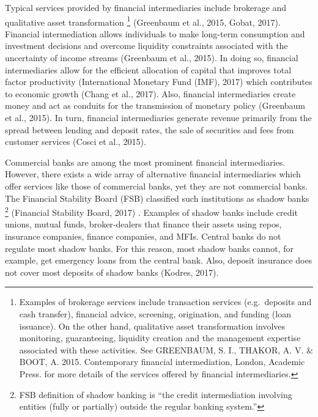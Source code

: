 \documentclass[a4paper, nobind]{templates/ociamthesis}
\begin{document}
Typical services provided by financial intermediaries include brokerage and qualitative asset transformation \footnote{Examples of brokerage services include transaction services (e.g.~deposits and cash transfer), financial advice, screening, origination, and funding (loan issuance). On the other hand, qualitative asset transformation involves monitoring, guaranteeing, liquidity creation and the management expertise associated with these activities. See GREENBAUM, S. I., THAKOR, A. V. \& BOOT, A. 2015. Contemporary financial intermediation, London, Academic Press. for more details of the services offered by financial intermediaries.} (Greenbaum et al., 2015, Gobat, 2017). Financial intermediation allows individuals to make long-term consumption and investment decisions and overcome liquidity constraints associated with the uncertainty of income streams (Greenbaum et al., 2015). In doing so, financial intermediaries allow for the efficient allocation of capital that improves total factor productivity (International Monetary Fund (IMF), 2017) which contributes to economic growth (Chang et al., 2017). Also, financial intermediaries create money and act as conduits for the transmission of monetary policy (Greenbaum et al., 2015). In turn, financial intermediaries generate revenue primarily from the spread between lending and deposit rates, the sale of securities and fees from customer services (Cosci et al., 2015).

Commercial banks are among the most prominent financial intermediaries. However, there exists a wide array of alternative financial intermediaries which offer services like those of commercial banks, yet they are not commercial banks. The Financial Stability Board (FSB) classified such institutions as shadow banks \footnote{FSB definition of shadow banking is ``the credit intermediation involving entities (fully or partially) outside the regular banking system.''} (Financial Stability Board, 2017) . Examples of shadow banks include credit unions, mutual funds, broker-dealers that finance their assets using repos, insurance companies, finance companies, and MFIs. Central banks do not regulate most shadow banks. For this reason, most shadow banks cannot, for example, get emergency loans from the central bank. Also, deposit insurance does not cover most deposits of shadow banks (Kodres, 2017).
\end{document}
